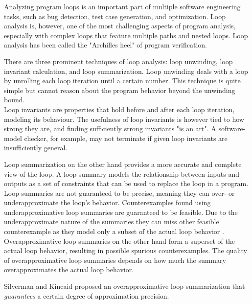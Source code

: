 
Analyzing program loops is an important part of multiple software engineering tasks, such as bug detection, test case generation, and optimization. Loop analysis is, however, one of the most challenging aspects of program analysis, especially with complex loops that feature multiple paths and nested loops. Loop analysis has been called the "Archilles heel" of program verification\cite{0.1007/s10703-012-0176-y}. \par
There are three prominent techniques of loop analysis: loop unwinding, loop invariant calculation, and loop summarization\cite{0.1007/s10703-012-0176-y, 8241837,10.1007/978-3-030-25543-5_7}. Loop unwinding deals with a loop by unrolling each loop iteration until a certain number. This technique is quite simple but cannot reason about the program behavior beyond the unwinding bound. \\
Loop invariants are properties that hold before and after each loop iteration, modeling its behaviour. The usefulness of loop invariants is however tied to how strong they are, and finding sufficiently strong invariants "is an art"\cite{0.1007/s10703-012-0176-y}. A software-model checker, for example, may not terminate if given loop invariants are insufficiently general. \par
Loop summarization on the other hand provides a more accurate and complete view of the loop. A loop summary models the relationship between inputs and outputs as a set of constraints that can be used to replace the loop in a program. Loop summaries are not guaranteed to be precise, meaning they can over- or underapproximate the loop's behavior. Counterexamples found using underapproximative loop summaries are guaranteed to be feasible. Due to the underapproximate nature of the summaries they can miss other feasible counterexample as they model only a subset of the actual loop behavior \cite{10.1007/s10703-015-0228-1}. Overapproximative loop summaries on the other hand form a superset of the actual loop behavior, resulting in possible spurious counterexamples. The quality of overapproximative loop summaries depends on how much the summary overapproximates the actual loop behavior.\\ \par
Silverman and Kincaid\cite{10.1007/978-3-030-25543-5_7} proposed an overapproximative loop summarization that \textsl{guarantees} a certain degree of approximation precision.\par 
